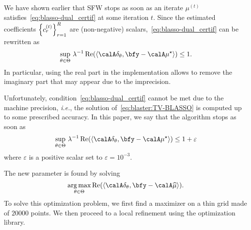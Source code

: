 We have shown earlier that SFW stops as soon as an iterate $\mu^{(t)}$ satisfies~\eqref{eq:blasso-dual_certif} at some iteration $t$.
Since the estimated coefficients $\kfamily{c_r^{(t)}}{r=1}^R$ are (non-negative) scalars,~\eqref{eq:blasso-dual_certif} can be rewritten as
\begin{equation}
	\sup_{\theta\in\Theta} \, \kinv{\lambda}\kRe\kparen{\kangle{
		\opObs{}\spike{\theta}, \bfy - \opObs{}\mu^\star
	}}
	\leq 1
	.
\end{equation}
In particular, using the real part in the implementation allows to remove the imaginary part that may appear due to the imprecision.

Unfortunately, condition~\eqref{eq:blasso-dual_certif} cannot be met due to the machine precision, \textit{i.e.}, the solution of~\eqref{eq:blaster:TV-BLASSO} is computed up to some prescribed accuracy.
In this paper, we say that the algorithm stops as soon as
\begin{equation}
	\sup_{\theta\in\Theta} \, \kinv{\lambda}\kRe\kparen{\kangle{
		\opObs{}\spike{\theta}, \bfy - \opObs{}\mu^\star
	}}
	\leq 1 + \varepsilon
\end{equation}
where $\varepsilon$ is a positive scalar set to $\varepsilon=10^{-3}$.

The new parameter is found by solving
\begin{equation}
	\kargmax_{\theta\in\Theta} \kRe\kparen{\kangle{\opObs\spike{\theta}, \bfy - \opObs{}\widehat{\mu}}}
	.
\end{equation}
To solve this optimization problem, we first find a maximizer on a thin grid made of $20000$ points.
We then proceed to a local refinement using the  optimization library.

